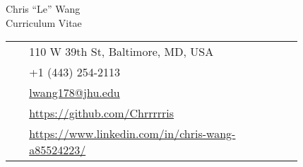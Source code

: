 \begin{paracol}{2}

  \parbox[top][0.12\textheight][c]{\linewidth}{ %
    \vspace{-0.04\textheight} %
    \centering %
        {\sffamily\Huge Chris ``Le'' Wang}\\\medskip %
        {\Huge\color{headings}\cvtextfont Curriculum Vitae}
  }
  \switchcolumn %

  \parbox[top][0.12\textheight][c]{\linewidth}{ %
    \vspace{-0.04\textheight} %
    \colorbox{shade}{ %
      \begin{supertabular}{p{0.05\linewidth}|p{0.775\linewidth}} %
        \raisebox{-1pt}{\faHome} & 110 W 39th St, Baltimore, MD, USA \\ %
        \raisebox{-1pt}{\faPhone} & +1 (443) 254-2113 \\ %
        \raisebox{0pt}{\small\faEnvelope} & \href{mailto:lwang178@jhu.edu}{lwang178@jhu.edu} \\ %
        \raisebox{-1pt}{\faGithub} & \href{https://github.com/Chrrrrris}{https://github.com/Chrrrrris} \\ %
        \raisebox{-1pt}{\faLinkedinSquare} & \href{https://www.linkedin.com/in/chris-wang-a85524223/}{https://www.linkedin.com/in/chris-wang-a85524223/} \\ %
      \end{supertabular}
    }
  }

\end{paracol}
